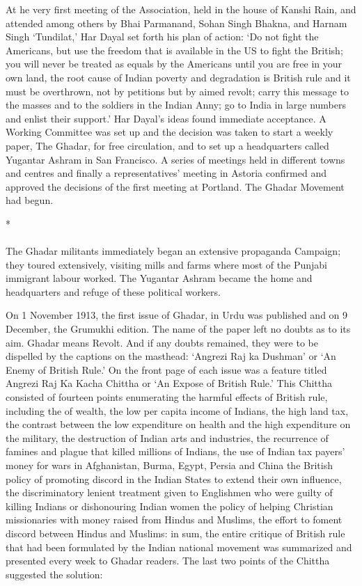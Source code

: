 At he very first meeting of the Association, held in the house of Kanshi Rain, and attended among others by Bhai Parmanand, Sohan Singh Bhakna, and Harnam Singh `Tundilat,' Har Dayal set forth his plan of action: `Do not fight the Americans, but use the freedom that is available in the US to fight the British; you will never be treated as equals by the Americans until you are free in your own land, the root cause of Indian poverty and degradation is British rule and it must be overthrown, not by petitions but by aimed revolt; carry this message to the masses and to the soldiers in the Indian Anny; go to India in large numbers and enlist their support.' Har Dayal's ideas found immediate acceptance. A Working Committee was set up and the decision was taken to start a weekly paper, The Ghadar, for free circulation, and to set up a headquarters called Yugantar Ashram in San Francisco. A series of meetings held in different towns and centres and finally a representatives' meeting in Astoria confirmed and approved the decisions of the first meeting at Portland. The Ghadar Movement had begun.

\begin{center}*\end{center}

\paragraph*{}


The Ghadar militants immediately began an extensive propaganda Campaign; they toured extensively, visiting mills and farms where most of the Punjabi immigrant labour worked. The Yugantar Ashram became the home and headquarters and refuge of these political workers.

On 1 November 1913, the first issue of Ghadar, in Urdu was published and on 9 December, the Grumukhi edition. The name of the paper left no doubts as to its aim. Ghadar means Revolt. And if any doubts remained, they were to be dispelled by the captions on the masthead: `Angrezi Raj ka Dushman' or `An Enemy of British Rule.' On the front page of each issue was a feature titled Angrezi Raj Ka Kacha Chittha or `An Expose of British Rule.' This Chittha consisted of fourteen points enumerating the harmful effects of British rule, including the of wealth, the low per capita income of Indians, the high land tax, the contrast between the low expenditure on health and the high expenditure on the military, the destruction of Indian arts and industries, the recurrence of famines and plague that killed millions of Indians, the use of Indian tax payers' money for wars in Afghanistan, Burma, Egypt, Persia and China the British policy of promoting discord in the Indian States to extend their own influence, the discriminatory lenient treatment given to Englishmen who were guilty of killing Indians or dishonouring Indian women the policy of helping Christian missionaries with money raised from Hindus and Muslims, the effort to foment discord between Hindus and Muslims: in sum, the entire critique of British rule that had been formulated by the Indian national movement was summarized and presented every week to Ghadar readers. The last two points of the Chittha suggested the solution:

